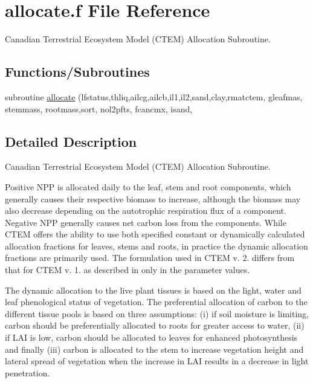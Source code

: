 \hypertarget{allocate_8f}{}\section{allocate.\+f File Reference}
\label{allocate_8f}


Canadian Terrestrial Ecosystem Model (C\+T\+E\+M) Allocation Subroutine.  


\subsection*{Functions/\+Subroutines}
\begin{DoxyCompactItemize}
\item 
subroutine \hyperlink{allocate_8f_aa4327082169256da29b83bf41b489db6}{allocate} (lfstatus,thliq,ailcg,ailcb,il1,il2,sand,clay,rmatctem, gleafmas, stemmass, rootmass,sort, nol2pfts, fcancmx, isand,
\end{DoxyCompactItemize}


\subsection{Detailed Description}
Canadian Terrestrial Ecosystem Model (C\+T\+E\+M) Allocation Subroutine. 

Positive N\+P\+P is allocated daily to the leaf, stem and root components, which generally causes their respective biomass to increase, although the biomass may also decrease depending on the autotrophic respiration flux of a component. Negative N\+P\+P generally causes net carbon loss from the components. While C\+T\+E\+M offers the ability to use both specified constant or dynamically calculated allocation fractions for leaves, stems and roots, in practice the dynamic allocation fractions are primarily used. The formulation used in C\+T\+E\+M v. 2. differs from that for C\+T\+E\+M v. 1. as described in \cite{Arora2005-6b1} only in the parameter values.

The dynamic allocation to the live plant tissues is based on the light, water and leaf phenological status of vegetation. The preferential allocation of carbon to the different tissue pools is based on three assumptions\+: (i) if soil moisture is limiting, carbon should be preferentially allocated to roots for greater access to water, (ii) if L\+A\+I is low, carbon should be allocated to leaves for enhanced photosynthesis and finally (iii) carbon is allocated to the stem to increase vegetation height and lateral spread of vegetation when the increase in L\+A\+I results in a decrease in light penetration.


